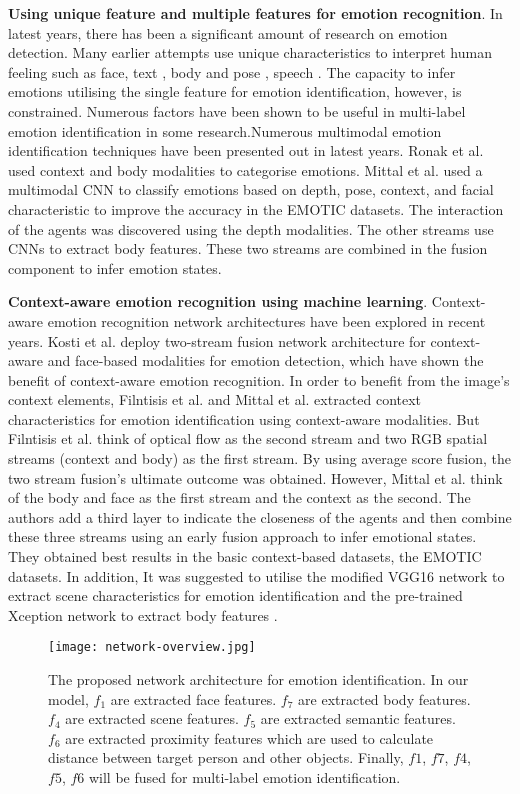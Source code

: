 \documentclass[conference]{IEEEtran}
\begin{document}
\textbf{Using unique feature and multiple features for emotion recognition}. In latest years, there has been a significant amount of research on emotion detection. Many earlier attempts use unique characteristics to interpret human feeling such as face\cite{ref-6},  text \cite{ref-13},  body and pose \cite{ref-9}, speech \cite{ref-16}. The capacity to infer emotions utilising the single feature for emotion identification, however, is constrained. Numerous factors have been shown to be useful in multi-label emotion identification in some research\cite{ref-20}.Numerous multimodal emotion identification techniques have been presented out in latest years. Ronak et al. \cite{ref-22} used context and body modalities to categorise emotions. Mittal et al. \cite{ref-21} used a multimodal CNN to classify emotions based on depth, pose, context, and facial characteristic to improve the accuracy in the EMOTIC datasets. The interaction of the agents was discovered using the depth modalities. The other streams use CNNs \cite{ref-48} to extract body features. These two streams are combined in the fusion component to infer emotion states.

\textbf{Context-aware emotion recognition using machine learning}. Context-aware emotion recognition network architectures have been explored in recent years. Kosti et al. \cite{ref-22} deploy two-stream fusion network architecture for context-aware and face-based modalities for emotion detection, which have shown the benefit of context-aware emotion recognition. In order to benefit from the image's context elements, Filntisis et al. \cite{ref-24} and Mittal et al. \cite{ref-21} extracted context characteristics for emotion identification using context-aware modalities. But Filntisis et al. \cite{ref-24} think of optical flow as the second stream and two RGB spatial streams (context and body) as the first stream. By using average score fusion, the two stream fusion's ultimate outcome was obtained. However, Mittal et al. \cite{ref-21} think of the body and face as the first stream and the context as the second. The authors add a third layer to indicate the closeness of the agents and then combine these three streams using an early fusion approach to infer emotional states. They obtained best results in the basic context-based datasets, the EMOTIC datasets. In addition, It was suggested to utilise the modified VGG16 network to extract scene characteristics for emotion identification and the pre-trained Xception network to extract body features\cite{ref-47} .
\begin{figure*}[!ht]
\centering
  \texttt{[image: network-overview.jpg]}
  \caption{The proposed network architecture for emotion identification. In our model, $f_1$ are extracted face features. $f_7$ are extracted body features. $f_4$ are extracted scene features. $f_5$ are extracted semantic features. $f_6$ are extracted proximity features which are used to calculate distance between target person and other objects. Finally, $f1$, $f7$, $f4$, $f5$, $f6$ will be fused for multi-label emotion identification.}
  \label{network-architecture}
\end{figure*}
\end{document}
